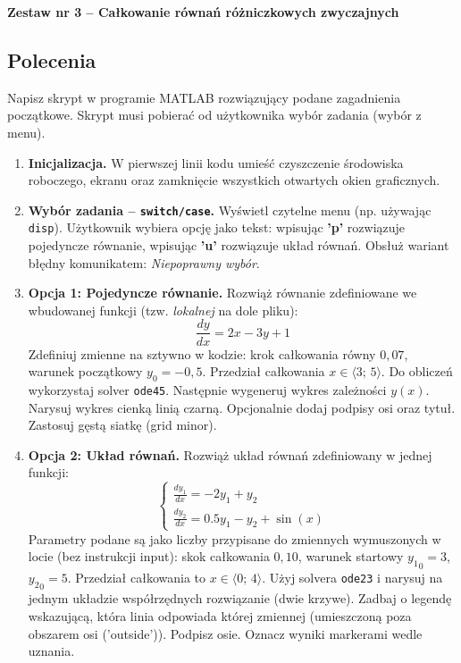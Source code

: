 \documentclass[a4paper,11pt]{article}
\begin{document}
\clearpage
\begin{center}
  {\large\bfseries Zestaw nr 3 \quad -- \quad Całkowanie równań różniczkowych zwyczajnych}
\end{center}
\hrulefill
\vspace{0.4cm}

\subsection*{Polecenia}

Napisz skrypt w programie MATLAB rozwiązujący podane zagadnienia początkowe. Skrypt musi pobierać od użytkownika wybór zadania (wybór z menu).

\begin{enumerate}[leftmargin=*, label=\textbf{\arabic*.}, itemsep=2pt]

  \item \textbf{Inicjalizacja.}
    W pierwszej linii kodu umieść czyszczenie środowiska roboczego, ekranu oraz zamknięcie wszystkich otwartych okien graficznych.

  \item \textbf{Wybór zadania -- \texttt{switch/case}.}
    Wyświetl czytelne menu (np. używając \texttt{disp}). Użytkownik wybiera opcję jako tekst: wpisując \textbf{'p'} rozwiązuje pojedyncze równanie, wpisując \textbf{'u'} rozwiązuje układ równań. Obsłuż wariant błędny komunikatem: \textit{Niepoprawny wybór}.

  \item \textbf{Opcja 1: Pojedyncze równanie.}
    Rozwiąż równanie zdefiniowane we wbudowanej funkcji (tzw. \textit{lokalnej} na dole pliku):
    \[ \frac{dy}{dx} = 2x - 3y + 1 \]
    Zdefiniuj zmienne na sztywno w kodzie: krok całkowania równy $0{,}07$, warunek początkowy $y_0 = -0{,}5$. Przedział całkowania $x \in \langle 3;\,5 \rangle$.
    Do obliczeń wykorzystaj solver \texttt{ode45}. Następnie wygeneruj wykres zależności $y(x)$. Narysuj wykres cienką linią czarną. Opcjonalnie dodaj podpisy osi oraz tytuł. Zastosuj gęstą siatkę (grid minor).

  \item \textbf{Opcja 2: Układ równań.}
    Rozwiąż układ równań zdefiniowany w jednej funkcji:\\[-0.5em]
    \[
    \begin{cases}
      \frac{dy_1}{dx} = -2y_1 + y_2 \\
      \frac{dy_2}{dx} = 0.5y_1 - y_2 + \sin(x)
    \end{cases}
    \]
    Parametry podane są jako liczby przypisane do zmiennych wymuszonych w locie (bez instrukcji input): skok całkowania $0{,}10$, warunek startowy $ {y_1}_{0} = 3 $, $ {y_2}_{0} = 5 $. Przedział całkowania to $x \in \langle 0;\,4 \rangle$.
    Użyj solvera \texttt{ode23} i narysuj na jednym układzie współrzędnych rozwiązanie (dwie krzywe). Zadbaj o legendę wskazującą, która linia odpowiada której zmiennej (umieszczoną poza obszarem osi ('outside')). Podpisz osie. Oznacz wyniki markerami wedle uznania.

\end{enumerate}
\end{document}
